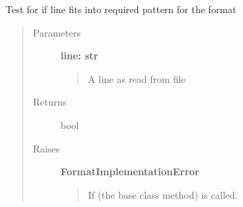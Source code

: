 \documentclass[letterpaper,10pt,english]{sphinxmanual}
\begin{document}
\begin{fulllineitems}

\begin{fulllineitems}
\label{fseq.reading:fseq.reading.seq_encoder.FastaMultiline.HEADER_LINE}
\end{fulllineitems}


\begin{fulllineitems}
\label{fseq.reading:fseq.reading.seq_encoder.FastaMultiline.QUALITY_LINE}
\end{fulllineitems}


\begin{fulllineitems}
\label{fseq.reading:fseq.reading.seq_encoder.FastaMultiline.SEQUENCE_LINE}
\end{fulllineitems}


\begin{fulllineitems}
\label{fseq.reading:fseq.reading.seq_encoder.FastaMultiline.expects}
Test for if line fits into required pattern for the format
\begin{quote}\begin{description}
\item[{Parameters}] \leavevmode
\textbf{line: str}
\begin{quote}

A line as read from file
\end{quote}

\item[{Returns}] \leavevmode
bool

\item[{Raises}] \leavevmode
\textbf{FormatImplementationError}
\begin{quote}

If  (the base class method) is called.
\end{quote}

\end{description}\end{quote}


\end{fulllineitems}
\end{fulllineitems}
\end{document}
